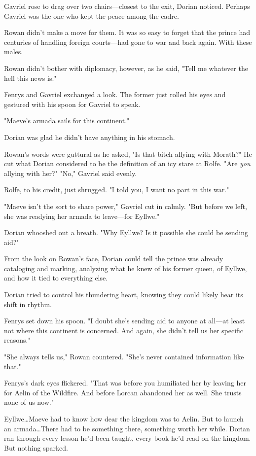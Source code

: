 Gavriel rose to drag over two chairs---closest to the exit, Dorian noticed.
Perhaps Gavriel was the one who kept the peace among the cadre.

Rowan didn't make a move for them.
It was so easy to forget that the prince had centuries of handling foreign courts---had gone to war and back again.
With these males.

Rowan didn't bother with diplomacy, however, as he said, "Tell me whatever the hell this news is."

Fenrys and Gavriel exchanged a look.
The former just rolled his eyes and gestured with his spoon for Gavriel to speak.

"Maeve's armada sails for this continent."

Dorian was glad he didn't have anything in his stomach.

Rowan's words were guttural as he asked, "Is that bitch allying with Morath?"
He cut what Dorian considered to be the definition of an icy stare at Rolfe.
"Are \emph{you} allying with her?"
"No," Gavriel said evenly.

Rolfe, to his credit, just shrugged.
"I told you, I want no part in this war."

"Maeve isn't the sort to share power," Gavriel cut in calmly.
"But before we left, she was readying her armada to leave---for Eyllwe."

Dorian whooshed out a breath.
"Why Eyllwe?
Is it possible she could be sending aid?"

From the look on Rowan's face, Dorian could tell the prince was already cataloging and marking, analyzing what he knew of his former queen, of Eyllwe, and how it tied to everything else.

Dorian tried to control his thundering heart, knowing they could likely hear its shift in rhythm.

Fenrys set down his spoon.
"I doubt she's sending aid to anyone at all---at least not where this continent is concerned.
And again, she didn't tell us her specific reasons."

"She always tells us," Rowan countered.
"She's never contained information like that."

Fenrys's dark eyes flickered.
"That was before you humiliated her by leaving her for Aelin of the Wildfire.
And before Lorcan abandoned her as well.
She trusts none of us now."

Eyllwe\ldots Maeve had to know how dear the kingdom was to Aelin.
But to launch an armada\ldots There had to be something there, something worth her while.
Dorian ran through every lesson he'd been taught, every book he'd read on the kingdom.
But nothing sparked.

